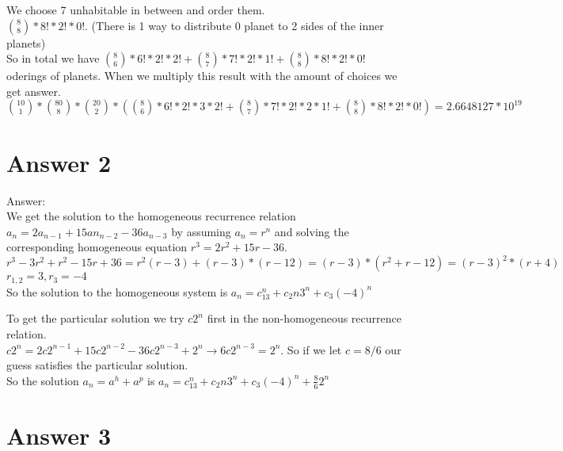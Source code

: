 \documentclass[11pt]{article}
\begin{document}
    We choose 7 unhabitable in between and order them.\\
    
    $\binom{8}{8}*8!*2!*0!$. (There is 1 way to distribute 0 planet to 2 sides of the inner planets)\\
    
    So in total we have $\binom{8}{6}*6!*2!*2! + \binom{8}{7}*7!*2!*1! + \binom{8}{8}*8!*2!*0!$ oderings of planets. When we multiply this result with the amount of choices we get answer.\\
    
    $\binom{10}{1} * \binom{80}{8} * \binom{20}{2} * (\binom{8}{6}*6!*2!*3*2! + \binom{8}{7}*7!*2!*2*1! + \binom{8}{8}*8!*2!*0!) = 2.6648127*10^{19}$\\
    
\section*{Answer 2}

Answer:\\
    
    We get the solution to the homogeneous recurrence relation $a_n = 2a_{n-1} + 15an_{n-2} - 36a_{n-3}$ by assuming $a_n = r^n$ and solving the corresponding homogeneous equation $r^3 = 2r^2 + 15r - 36$.\\
    
    $r^3 - 3r^2 + r^2 -15r +36 = r^2(r-3) + (r-3)*(r-12) = (r-3)*(r^2+r-12) = (r-3)^2*(r+4)$\\
    
    $r_{1,2} = 3, r_3 = -4$\\
    
    So the solution to the homogeneous system is $a_n = c_13^n + c_2n3^n + c_3(-4)^n$
    
    To get the particular solution we try $c2^n$ first in the non-homogeneous recurrence relation.\\
    
    $c2^n = 2c2^{n-1} + 15c2^{n-2} -36c2^{n-3} + 2^n \rightarrow 6c2^{n-3} = 2^n$. So if we let $c = 8/6$ our guess satisfies the particular solution.\\
    
    So the solution $a_n = a^h + a^p$ is $a_n = c_13^n + c_2n3^n + c_3(-4)^n + \frac{8}{6}2^n$

\section*{Answer 3}
\end{document}
